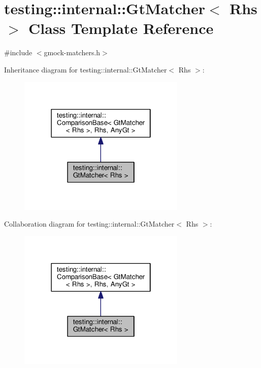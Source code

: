 \hypertarget{classtesting_1_1internal_1_1_gt_matcher}{}\section{testing\+:\+:internal\+:\+:Gt\+Matcher$<$ Rhs $>$ Class Template Reference}
\label{classtesting_1_1internal_1_1_gt_matcher}


{\ttfamily \#include $<$gmock-\/matchers.\+h$>$}



Inheritance diagram for testing\+:\+:internal\+:\+:Gt\+Matcher$<$ Rhs $>$\+:
\nopagebreak
\begin{figure}[H]
\begin{center}
\leavevmode
\includegraphics[width=226pt]{classtesting_1_1internal_1_1_gt_matcher__inherit__graph}
\end{center}
\end{figure}


Collaboration diagram for testing\+:\+:internal\+:\+:Gt\+Matcher$<$ Rhs $>$\+:
\nopagebreak
\begin{figure}[H]
\begin{center}
\leavevmode
\includegraphics[width=226pt]{classtesting_1_1internal_1_1_gt_matcher__coll__graph}
\end{center}
\end{figure}
